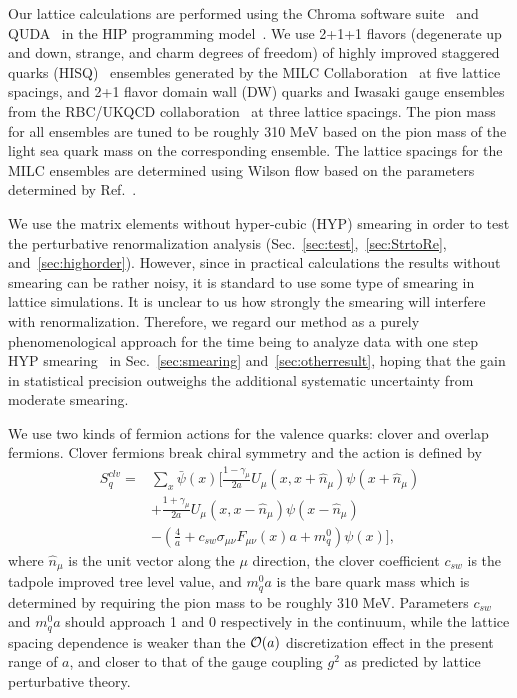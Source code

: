   
Our lattice calculations are performed using the Chroma software suite~\cite{Edwards:2004sx} and QUDA~\cite{Clark:2009wm,Babich:2011np,Clark:2016rdz} in the HIP programming model~\cite{Bi:2020wpt}. We use 2+1+1 flavors (degenerate up and down, strange, and charm degrees of freedom) of highly improved staggered quarks (HISQ)~\cite{Follana:2006rc} ensembles generated by the MILC Collaboration~\cite{Bazavov:2012xda} at five lattice spacings, and 2+1 
flavor domain wall (DW) quarks and Iwasaki gauge
ensembles from the RBC/UKQCD collaboration~\cite{Blum:2014tka} at
three lattice spacings. The pion mass for all ensembles are tuned to be roughly 310 MeV based on the pion mass of the light sea quark mass on the corresponding ensemble. The lattice spacings for the MILC ensembles are determined using Wilson flow based on the parameters determined by Ref.~\cite{Miller:2020evg}.

We use the matrix elements without hyper-cubic (HYP) smearing in order
to test the perturbative renormalization analysis (Sec.~\ref{sec:test},~\ref{sec:StrtoRe}, and~\ref{sec:highorder}). 
However, since in practical calculations the results without smearing can 
be rather noisy, it is standard to use some type of smearing in lattice simulations. It is unclear to us how strongly the smearing will interfere with renormalization. Therefore, we regard our method as a purely phenomenological approach for the time being to analyze data with one step HYP smearing~\cite{Hasenfratz:2001hp} in Sec.~\ref{sec:smearing} and~\ref{sec:otherresult}, hoping that the gain in statistical precision outweighs the additional systematic uncertainty 
from moderate smearing.


We use two kinds of fermion actions for the valence quarks: clover and overlap fermions. Clover fermions break chiral symmetry and the action is defined by
\begin{align}\label{eq:clover}
S^{clv}_{q}=&\sum_{x}\bar{\psi}(x)\bigg[\frac{1-\gamma_{\mu}}{2a}U_{\mu}(x,x+\hat{n}_{\mu})\psi(x+\hat{n}_{\mu})\nonumber\\
&+\frac{1+\gamma_{\mu}}{2a}U_{\mu}(x,x-\hat{n}_{\mu})\psi(x-\hat{n}_{\mu})\nonumber\\
&-\left(\frac{4}{a}+c_{sw}\sigma_{\mu\nu} F_{\mu\nu}(x)a+m_q^0\right)\psi(x)\bigg],
\end{align}
where $\hat{n}_{\mu}$ is the unit vector along the $\mu$ direction, the clover coefficient $c_{sw}$ is the tadpole improved tree level value, and $m^0_{q}a$ is the bare quark mass which is determined by requiring the pion mass to be roughly 310 MeV.  Parameters $c_{sw}$ and $m^0_{q}a$ should approach 1 and 0 respectively in the continuum, while the lattice spacing dependence is weaker than the ${\cal O}(a)$ discretization effect in the present range of $a$, and closer to that of the gauge coupling $g^2$ as predicted by lattice perturbative theory. 

